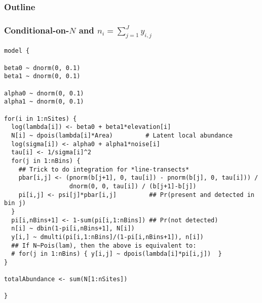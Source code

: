 \documentclass[color=usenames,dvipsnames]{beamer}\usepackage[]{graphicx}\usepackage[]{xcolor}
\makeatletter
\newenvironment{kframe}{%
 \def\at@end@of@kframe{}%
 \ifinner\ifhmode%
  \def\at@end@of@kframe{\end{minipage}}%
  \begin{minipage}{\columnwidth}%
 \fi\fi%
 \def\FrameCommand##1{\hskip\@totalleftmargin \hskip-\fboxsep
 \colorbox{shadecolor}{##1}\hskip-\fboxsep
     \hskip-\linewidth \hskip-\@totalleftmargin \hskip\columnwidth}%
 \MakeFramed {\advance\hsize-\width
   \@totalleftmargin\z@ \linewidth\hsize
   \@setminipage}}%
 {\par\unskip\endMakeFramed%
 \at@end@of@kframe}
\newenvironment{knitrout}{}{} %
\makeatother
\begin{document}
\begin{frame}
  \frametitle{Outline}
  \Large
\end{frame}





\begin{frame}[fragile]
  \frametitle{\normalsize Conditional-on-$N$ and $n_i=\sum_{j=1}^{J} y_{i,j}$}
\vspace{-3pt}
\begin{knitrout}\tiny
{}\color{fgcolor}\begin{kframe}
\begin{verbatim}
model {

beta0 ~ dnorm(0, 0.1)
beta1 ~ dnorm(0, 0.1)

alpha0 ~ dnorm(0, 0.1)
alpha1 ~ dnorm(0, 0.1)

for(i in 1:nSites) {
  log(lambda[i]) <- beta0 + beta1*elevation[i]
  N[i] ~ dpois(lambda[i]*Area)         # Latent local abundance
  log(sigma[i]) <- alpha0 + alpha1*noise[i]
  tau[i] <- 1/sigma[i]^2
  for(j in 1:nBins) {
    ## Trick to do integration for *line-transects*
    pbar[i,j] <- (pnorm(b[j+1], 0, tau[i]) - pnorm(b[j], 0, tau[i])) /
                  dnorm(0, 0, tau[i]) / (b[j+1]-b[j])
    pi[i,j] <- psi[j]*pbar[i,j]         ## Pr(present and detected in bin j)
  }
  pi[i,nBins+1] <- 1-sum(pi[i,1:nBins]) ## Pr(not detected)
  n[i] ~ dbin(1-pi[i,nBins+1], N[i])
  y[i,] ~ dmulti(pi[i,1:nBins]/(1-pi[i,nBins+1]), n[i])
  ## If N~Pois(lam), then the above is equivalent to:
  # for(j in 1:nBins) { y[i,j] ~ dpois(lambda[i]*pi[i,j])  }
}

totalAbundance <- sum(N[1:nSites])

}
\end{verbatim}
\end{kframe}
\end{knitrout}
\end{frame}
\end{document}

